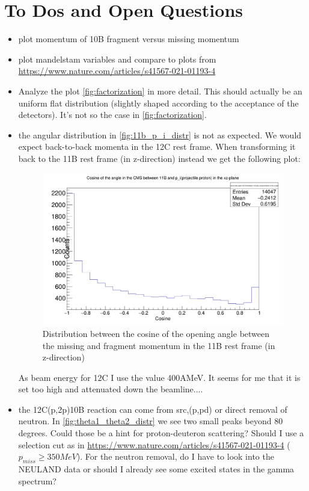 \documentclass{report}
\begin{document}
\section{To Dos and Open Questions}
\begin{itemize}
\item plot momentum of 10B fragment versus missing momentum
\item plot mandelstam variables and compare to plots from \url{https://www.nature.com/articles/s41567-021-01193-4}
\item Analyze the plot \ref{fig:factorization} in more detail. This should actually be an uniform flat distribution (slightly shaped according to the acceptance of the detectors). It's not so the case in \ref{fig:factorization}.
\item the angular distribution in \ref{fig:11b_p_i_distr} is not as expected. We would expect back-to-back momenta in the 12C rest frame. When transforming it back to the 11B  rest frame (in z-direction) instead we get the following plot:\newline
\begin{figure}[!htb]
  \includegraphics[width=\linewidth]{cos_11b_back_to_back.png}
	\caption{Distribution between the cosine of the opening angle between the missing and fragment momentum in the 11B rest frame (in z-direction)}
\end{figure}
\newline
As beam energy for 12C I use the value 400AMeV. It seems for me that it is set too high and attenuated down the beamline....
\item the 12C(p,2p)10B reaction can come from src,(p,pd) or direct removal of neutron. In \ref{fig:theta1_theta2_distr} we see two small peaks beyond 80 degrees. Could those be a hint for proton-deuteron scattering? Should I use a selection cut as in \url{https://www.nature.com/articles/s41567-021-01193-4} ($p_{miss} \geq 350 MeV$). For the neutron removal, do I have to look into the NEULAND data or should I already see some excited states in the gamma spectrum?

\end{itemize}
\end{document}
